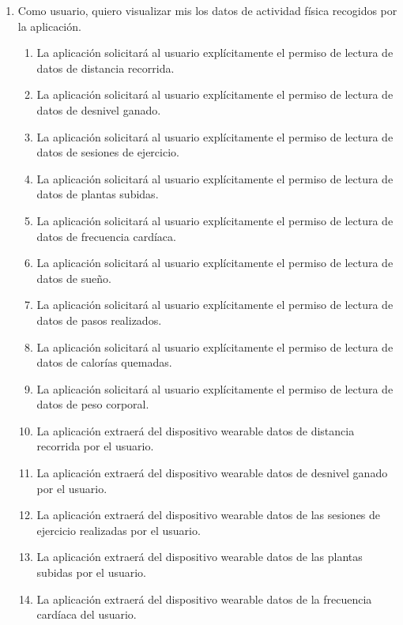         \begin{enumerate}[resume=req-usuario,label=\textbf{\texttt{RU-\arabic*}}]
            \item Como usuario, quiero visualizar mis los datos de actividad física recogidos por la aplicación.
            \begin{enumerate}[resume=req-funcionales,label=\textbf{\texttt{RF-\arabic*}}]
                \item La aplicación solicitará al usuario explícitamente el permiso de lectura de datos de distancia recorrida.
                \item La aplicación solicitará al usuario explícitamente el permiso de lectura de datos de desnivel ganado.
                \item La aplicación solicitará al usuario explícitamente el permiso de lectura de datos de sesiones de ejercicio.
                \item La aplicación solicitará al usuario explícitamente el permiso de lectura de datos de plantas subidas.
                \item La aplicación solicitará al usuario explícitamente el permiso de lectura de datos de frecuencia cardíaca.
                \item La aplicación solicitará al usuario explícitamente el permiso de lectura de datos de sueño.
                \item La aplicación solicitará al usuario explícitamente el permiso de lectura de datos de pasos realizados.
                \item La aplicación solicitará al usuario explícitamente el permiso de lectura de datos de calorías quemadas.
                \item La aplicación solicitará al usuario explícitamente el permiso de lectura de datos de peso corporal.
                \item La aplicación extraerá del dispositivo \gls{wearable} datos de distancia recorrida por el usuario.
                \item La aplicación extraerá del dispositivo \gls{wearable} datos de desnivel ganado por el usuario.
                \item La aplicación extraerá del dispositivo \gls{wearable} datos de las sesiones de ejercicio realizadas por el usuario.
                \item La aplicación extraerá del dispositivo \gls{wearable} datos de las plantas subidas por el usuario.
                \item La aplicación extraerá del dispositivo \gls{wearable} datos de la frecuencia cardíaca del usuario.

\end{enumerate}
\end{enumerate}
